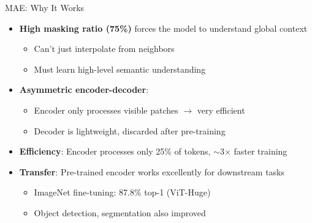 \documentclass[11pt]{beamer}
\begin{document}
\begin{frame}{MAE: Why It Works}
    \begin{itemize}
        \item \textbf{High masking ratio (75\%)} forces the model to understand global context
            \begin{itemize}
                \item Can't just interpolate from neighbors
                \item Must learn high-level semantic understanding
            \end{itemize}
        \item \textbf{Asymmetric encoder-decoder}:
            \begin{itemize}
                \item Encoder only processes visible patches $\to$ very efficient
                \item Decoder is lightweight, discarded after pre-training
            \end{itemize}
        \item \textbf{Efficiency}: Encoder processes only 25\% of tokens, $\sim$3$\times$ faster training
        \item \textbf{Transfer}: Pre-trained encoder works excellently for downstream tasks
            \begin{itemize}
                \item ImageNet fine-tuning: 87.8\% top-1 (ViT-Huge)
                \item Object detection, segmentation also improved
            \end{itemize}
    \end{itemize}
\end{frame}
\end{document}
